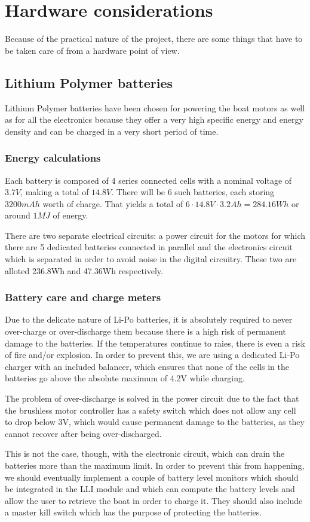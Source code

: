 \chapter{Hardware considerations}

Because of the practical nature of the project, there are some things that have to be taken care of from a hardware point of view.

\section{Lithium Polymer batteries}

Lithium Polymer batteries have been chosen for powering the boat motors as well as for all the electronics because they offer a very high specific energy and energy density and can be charged in a very short period of time. 

\subsection{Energy calculations}

Each battery is composed of 4 series connected cells with a nominal voltage of $ 3.7V $, making a total of $ 14.8V $. There will be 6 such batteries, each storing $ 3200mAh $ worth of charge. That yields a total of $ 6 \cdot 14.8V \cdot 3.2Ah = 284.16Wh $ or around $ 1MJ $ of energy.

There are two separate electrical circuits: a power circuit for the motors for which there are 5 dedicated batteries connected in parallel and the electronics circuit which is separated in order to avoid noise in the digital circuitry. These two are alloted 236.8Wh and 47.36Wh respectively.

\subsection{Battery care and charge meters}

Due to the delicate nature of Li-Po batteries, it is absolutely required to never over-charge or over-discharge them because there is a high risk of permanent damage to the batteries. If the temperatures continue to raies, there is even a risk of fire and/or explosion. In order to prevent this, we are using a dedicated Li-Po charger with an included balancer, which ensures that none of the cells in the batteries go above the absolute maximum of 4.2V while charging.

The problem of over-discharge is solved in the power circuit due to the fact that the brushless motor controller has a safety switch which does not allow any cell to drop below 3V, which would cause permanent damage to the batteries, as they cannot recover after being over-discharged. 

This is not the case, though, with the electronic circuit, which can drain the batteries more than the maximum limit. In order to prevent this from happening, we should eventually implement a couple of battery level monitors which should be integrated in the \ac{LLI} module and which can compute the battery levels and allow the user to retrieve the boat in order to charge it. They should also include a master kill switch which has the purpose of protecting the batteries.
